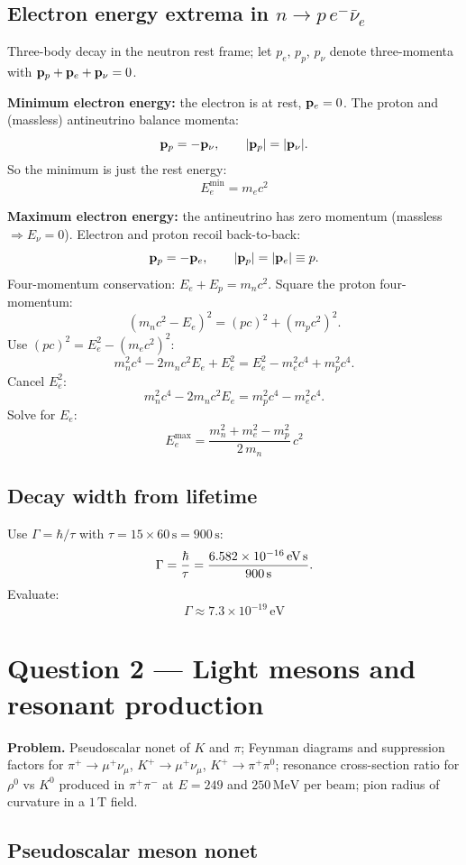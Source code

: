\documentclass[11pt]{article}
\newcommand{\MeV}{\,\mathrm{MeV}}
\begin{document}
\subsection*{Electron energy extrema in $n\to p\,e^-\bar\nu_e$}

Three-body decay in the neutron rest frame; let $p_e$, $p_p$, $p_\nu$ denote three-momenta with $\vb p_p+\vb p_e+\vb p_\nu = 0$.

\textbf{Minimum electron energy:} the electron is at rest, $\vb p_e=0$. The proton and (massless) antineutrino balance momenta:
\[
\vb p_p = -\vb p_\nu, \qquad |\vb p_p| = |\vb p_\nu|.
\]
So the minimum is just the rest energy:
\[
\boxed{\;E_e^{\min} = m_e c^2\;}
\]

\textbf{Maximum electron energy:} the antineutrino has zero momentum (massless $\Rightarrow E_\nu=0$). Electron and proton recoil back-to-back:
\[
\vb p_p = -\vb p_e, \qquad |\vb p_p| = |\vb p_e| \equiv p.
\]
Four-momentum conservation: $E_e + E_p = m_n c^2$. Square the proton four-momentum:
\[
(m_n c^2 - E_e)^2 = (p c)^2 + (m_p c^2)^2.
\]
Use $(pc)^2 = E_e^2 - (m_e c^2)^2$:
\[
m_n^2 c^4 - 2 m_n c^2 E_e + E_e^2 = E_e^2 - m_e^2 c^4 + m_p^2 c^4.
\]
Cancel $E_e^2$:
\[
m_n^2 c^4 - 2 m_n c^2 E_e = m_p^2 c^4 - m_e^2 c^4.
\]
Solve for $E_e$:
\[
\boxed{\;E_e^{\max} = \frac{m_n^2 + m_e^2 - m_p^2}{2\,m_n}\,c^2\;}
\]

\subsection*{Decay width from lifetime}

Use $\Gamma = \hbar/\tau$ with $\tau = 15 \times 60\,\text{s} = 900\,\text{s}$:
\[
\Gamma = \frac{\hbar}{\tau} = \frac{6.582\times10^{-16}\,\text{eV\,s}}{900\,\text{s}}.
\]
Evaluate:
\[
\boxed{\;\Gamma \approx 7.3\times10^{-19}\,\text{eV}\;}
\]

\section*{Question 2 --- Light mesons and resonant production}

\textbf{Problem.} Pseudoscalar nonet of $K$ and $\pi$; Feynman diagrams and suppression factors for $\pi^+\!\to\mu^+\nu_\mu$, $K^+\!\to\mu^+\nu_\mu$, $K^+\!\to\pi^+\pi^0$; resonance cross-section ratio for $\rho^0$ vs $K^0$ produced in $\pi^+\pi^-$ at $E=249$ and $250\MeV$ per beam; pion radius of curvature in a $1\,\text{T}$ field.

\subsection*{Pseudoscalar meson nonet}
\end{document}
